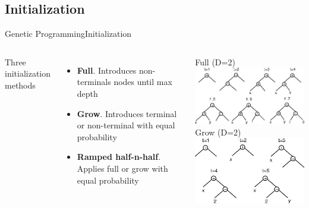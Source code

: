 \documentclass[10pt,compress]{beamer} %
\begin{document}
\subsection{Initialization}
\begin{frame}{Genetic Programming}{Initialization} 
	\vspace{-0.2cm}
    \begin{columns}
		Three initialization methods
		\begin{itemize}
			\item \textbf{Full}. Introduces non-terminals nodes until max depth
			\item \textbf{Grow}. Introduces terminal or non-terminal with equal probability
			\item \textbf{Ramped half-n-half}. Applies full or grow with equal probability
		\end{itemize}

		\begin{center}
			Full (D=2)\\
			\includegraphics[width=\linewidth]{figs/full.jpg}\\
			\bigskip
			Grow (D=2)\\
			\includegraphics[width=\linewidth]{figs/grow.jpg}
		\end{center}
	\end{columns}
\end{frame}
\end{document}
